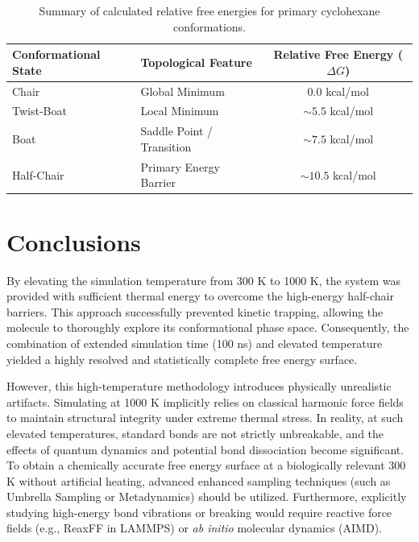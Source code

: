 \documentclass[11pt, a4paper]{article}
\begin{document}
\begin{table}[htbp]
  \centering
  \begin{tabular}{llc}
    \hline
    \textbf{Conformational State} & \textbf{Topological Feature} & \textbf{Relative Free Energy ($\Delta G$)} \\
    \hline
    Chair & Global Minimum & 0.0 kcal/mol \\
    Twist-Boat & Local Minimum & $\sim 5.5$ kcal/mol \\
    Boat & Saddle Point / Transition & $\sim 7.5$ kcal/mol \\
    Half-Chair & Primary Energy Barrier & $\sim 10.5$ kcal/mol \\
    \hline
  \end{tabular}
  \caption{Summary of calculated relative free energies for primary cyclohexane conformations.}
  \label{tab:energies}
\end{table}

\section{Conclusions}
By elevating the simulation temperature from 300 K to 1000 K, the system was provided with sufficient thermal energy to overcome the high-energy half-chair barriers. This approach successfully prevented kinetic trapping, allowing the molecule to thoroughly explore its conformational phase space. Consequently, the combination of extended simulation time (100 ns) and elevated temperature yielded a highly resolved and statistically complete free energy surface.

However, this high-temperature methodology introduces physically unrealistic artifacts. Simulating at 1000 K implicitly relies on classical harmonic force fields to maintain structural integrity under extreme thermal stress. In reality, at such elevated temperatures, standard bonds are not strictly unbreakable, and the effects of quantum dynamics and potential bond dissociation become significant. To obtain a chemically accurate free energy surface at a biologically relevant 300 K without artificial heating, advanced enhanced sampling techniques (such as Umbrella Sampling or Metadynamics) should be utilized. Furthermore, explicitly studying high-energy bond vibrations or breaking would require reactive force fields (e.g., ReaxFF in LAMMPS) or \textit{ab initio} molecular dynamics (AIMD).
\end{document}
